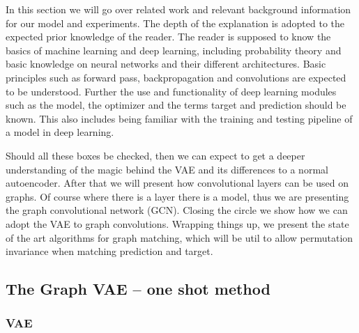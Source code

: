 In this section we will go over related work and relevant background information for our model and experiments. The depth of the explanation is adopted to the expected prior knowledge of the reader. The reader is supposed to know the basics of machine learning and deep learning, including probability theory and basic knowledge on neural networks and their different architectures. Basic principles such as forward pass, backpropagation and convolutions are expected to be understood. Further the use and functionality of deep learning modules such as the model, the optimizer and the terms target and prediction should be known. This also includes being familiar with the training and testing pipeline of a model in deep learning.

Should all these boxes be checked, then we can expect to get a deeper understanding of the magic behind the VAE and its differences to a normal autoencoder. After that we will present how convolutional layers can be used on graphs. Of course where there is a layer there is a model, thus we are presenting the graph convolutional network (GCN). Closing the circle we show how we can adopt the VAE to graph convolutions. Wrapping things up, we present the state of the art algorithms for graph matching, which will be util to allow permutation invariance when matching prediction and target.  

\subsection{The Graph VAE – one shot method}

\subsubsection{VAE}



